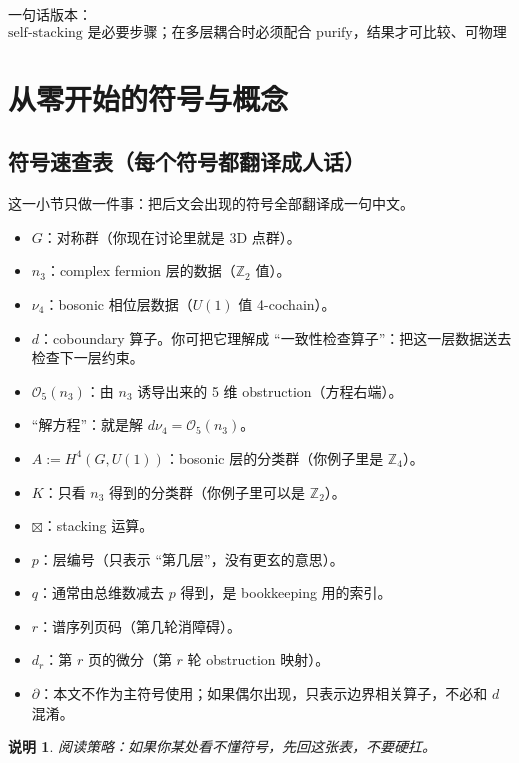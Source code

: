 \documentclass[a4paper,fontset=ubuntu,12pt]{ctexart}
\newtheorem{remark}[definition]{说明}
\begin{document}
一句话版本：
\begin{equation}
\text{self-stacking 是必要步骤；在多层耦合时必须配合 purify，结果才可比较、可物理解释。}
\label{eq:one-line-summary}
\end{equation}

\section{从零开始的符号与概念}
\label{sec:notation}

\subsection{符号速查表（每个符号都翻译成人话）}
\label{sec:symbol-dict}

这一小节只做一件事：把后文会出现的符号全部翻译成一句中文。

\begin{itemize}
\item $G$：对称群（你现在讨论里就是 3D 点群）。
\item $n_3$：complex fermion 层的数据（$\mathbb{Z}_2$ 值）。
\item $\nu_4$：bosonic 相位层数据（$U(1)$ 值 4-cochain）。
\item $d$：coboundary 算子。你可把它理解成 ``一致性检查算子''：把这一层数据送去检查下一层约束。
\item $\mathcal{O}_5(n_3)$：由 $n_3$ 诱导出来的 5 维 obstruction（方程右端）。
\item ``解方程''：就是解 $d\nu_4=\mathcal{O}_5(n_3)$。
\item $A:=H^4(G,U(1))$：bosonic 层的分类群（你例子里是 $\mathbb{Z}_4$）。
\item $K$：只看 $n_3$ 得到的分类群（你例子里可以是 $\mathbb{Z}_2$）。
\item $\boxtimes$：stacking 运算。
\item $p$：层编号（只表示 ``第几层''，没有更玄的意思）。
\item $q$：通常由总维数减去 $p$ 得到，是 bookkeeping 用的索引。
\item $r$：谱序列页码（第几轮消障碍）。
\item $d_r$：第 $r$ 页的微分（第 $r$ 轮 obstruction 映射）。
\item $\partial$：本文不作为主符号使用；如果偶尔出现，只表示边界相关算子，不必和 $d$ 混淆。
\end{itemize}

\begin{remark}
阅读策略：如果你某处看不懂符号，先回这张表，不要硬扛。
\end{remark}
\end{document}
